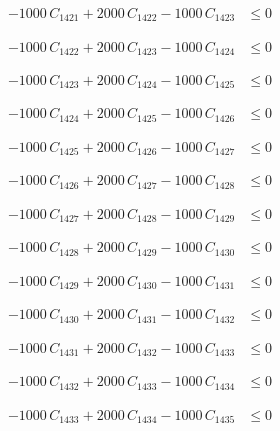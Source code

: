 \documentclass[a4paper,11pt]{article}
\begin{document}
\begin{align}
-1000\,C_{1421} + 2000\,C_{1422} - 1000\,C_{1423} &\leq 0 \nonumber
\end{align}

\begin{align}
-1000\,C_{1422} + 2000\,C_{1423} - 1000\,C_{1424} &\leq 0 \nonumber
\end{align}

\begin{align}
-1000\,C_{1423} + 2000\,C_{1424} - 1000\,C_{1425} &\leq 0 \nonumber
\end{align}

\begin{align}
-1000\,C_{1424} + 2000\,C_{1425} - 1000\,C_{1426} &\leq 0 \nonumber
\end{align}

\begin{align}
-1000\,C_{1425} + 2000\,C_{1426} - 1000\,C_{1427} &\leq 0 \nonumber
\end{align}

\begin{align}
-1000\,C_{1426} + 2000\,C_{1427} - 1000\,C_{1428} &\leq 0 \nonumber
\end{align}

\begin{align}
-1000\,C_{1427} + 2000\,C_{1428} - 1000\,C_{1429} &\leq 0 \nonumber
\end{align}

\begin{align}
-1000\,C_{1428} + 2000\,C_{1429} - 1000\,C_{1430} &\leq 0 \nonumber
\end{align}

\begin{align}
-1000\,C_{1429} + 2000\,C_{1430} - 1000\,C_{1431} &\leq 0 \nonumber
\end{align}

\begin{align}
-1000\,C_{1430} + 2000\,C_{1431} - 1000\,C_{1432} &\leq 0 \nonumber
\end{align}

\begin{align}
-1000\,C_{1431} + 2000\,C_{1432} - 1000\,C_{1433} &\leq 0 \nonumber
\end{align}

\begin{align}
-1000\,C_{1432} + 2000\,C_{1433} - 1000\,C_{1434} &\leq 0 \nonumber
\end{align}

\begin{align}
-1000\,C_{1433} + 2000\,C_{1434} - 1000\,C_{1435} &\leq 0 \nonumber
\end{align}
\end{document}
